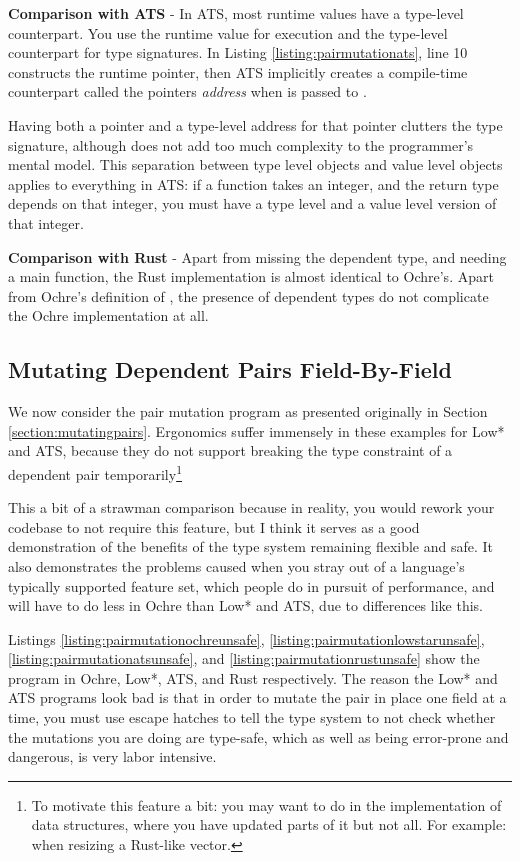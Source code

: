 \documentclass[12pt,twoside]{report}
\begin{document}
\textbf{Comparison with ATS} - In ATS, most runtime values have a type-level counterpart. You use the runtime value for execution and the type-level counterpart for type signatures. In Listing \ref{listing:pairmutationats}, line 10 constructs the runtime pointer, then ATS implicitly creates a compile-time counterpart called the pointers \textit{address} when  is passed to .

Having both a pointer and a type-level address for that pointer clutters the type signature, although does not add too much complexity to the programmer's mental model. This separation between type level objects and value level objects applies to everything in ATS: if a function takes an integer, and the return type depends on that integer, you must have a type level and a value level version of that integer.

\textbf{Comparison with Rust} - Apart from missing the dependent type, and needing a main function, the Rust implementation is almost identical to Ochre's. Apart from Ochre's definition of , the presence of dependent types do not complicate the Ochre implementation at all.

\subsection{Mutating Dependent Pairs Field-By-Field}
We now consider the pair mutation program as presented originally in Section \ref{section:mutatingpairs}. Ergonomics suffer immensely in these examples for Low* and ATS, because they do not support breaking the type constraint of a dependent pair temporarily\footnote{To motivate this feature a bit: you may want to do in the implementation of data structures, where you have updated parts of it but not all. For example: when resizing a Rust-like vector.}

This a bit of a strawman comparison because in reality, you would rework your codebase to not require this feature, but I think it serves as a good demonstration of the benefits of the type system remaining flexible and safe. It also demonstrates the problems caused when you stray out of a language's typically supported feature set, which people do in pursuit of performance, and will have to do less in Ochre than Low* and ATS, due to differences like this.

Listings \ref{listing:pairmutationochreunsafe}, \ref{listing:pairmutationlowstarunsafe}, \ref{listing:pairmutationatsunsafe}, and \ref{listing:pairmutationrustunsafe} show the program in Ochre, Low*, ATS, and Rust respectively. The reason the Low* and ATS programs look bad is that in order to mutate the pair in place one field at a time, you must use escape hatches to tell the type system to not check whether the mutations you are doing are type-safe, which as well as being error-prone and dangerous, is very labor intensive.
\end{document}
